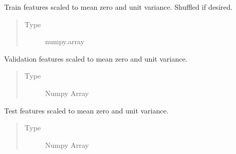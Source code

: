 \documentclass[letterpaper,10pt,english]{sphinxmanual}
\begin{document}
\begin{fulllineitems}
\begin{fulllineitems}
\begin{quote}
\begin{description}
\end{description}\end{quote}

\end{fulllineitems}


\begin{fulllineitems}
\label{\detokenize{api/ucf.TrainingDataSets:ucf.TrainingDataSets.scaled_train_features}}
Train features scaled to mean zero and unit variance. Shuffled
if desired.
\begin{quote}\begin{description}
\item[{Type}] \leavevmode
numpy.array

\end{description}\end{quote}

\end{fulllineitems}


\begin{fulllineitems}
\label{\detokenize{api/ucf.TrainingDataSets:ucf.TrainingDataSets.scaled_validation_features}}
Validation features scaled to mean zero and unit variance.
\begin{quote}\begin{description}
\item[{Type}] \leavevmode
Numpy Array

\end{description}\end{quote}

\end{fulllineitems}


\begin{fulllineitems}
\label{\detokenize{api/ucf.TrainingDataSets:ucf.TrainingDataSets.scaled_test_features}}
Test features scaled to mean zero and unit variance.
\begin{quote}\begin{description}
\item[{Type}] \leavevmode
Numpy Array


\end{description}
\end{quote}
\end{fulllineitems}
\end{fulllineitems}
\end{document}
